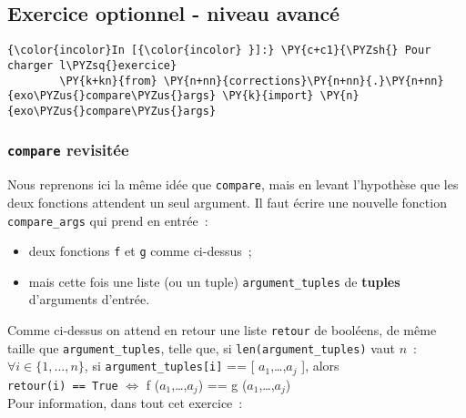     \hypertarget{exercice-optionnel---niveau-avancuxe9}{%
\subsection{Exercice optionnel - niveau
avancé}\label{exercice-optionnel---niveau-avancuxe9}}

    \begin{Verbatim}[commandchars=\\\{\}]
{\color{incolor}In [{\color{incolor} }]:} \PY{c+c1}{\PYZsh{} Pour charger l\PYZsq{}exercice}
        \PY{k+kn}{from} \PY{n+nn}{corrections}\PY{n+nn}{.}\PY{n+nn}{exo\PYZus{}compare\PYZus{}args} \PY{k}{import} \PY{n}{exo\PYZus{}compare\PYZus{}args}
\end{Verbatim}


    \hypertarget{compare-revisituxe9e}{%
\subsubsection{\texorpdfstring{\texttt{compare}
revisitée}{compare revisitée}}\label{compare-revisituxe9e}}

    Nous reprenons ici la même idée que \texttt{compare}, mais en levant
l'hypothèse que les deux fonctions attendent un seul argument. Il faut
écrire une nouvelle fonction \texttt{compare\_args} qui prend en
entrée~:

\begin{itemize}
	\item 
	deux fonctions \texttt{f} et \texttt{g} comme ci-dessus~;
	\item
	mais cette fois une liste (ou un tuple) \texttt{argument\_tuples} de
	\textbf{tuples} d'arguments d'entrée.
\end{itemize}

Comme ci-dessus on attend en retour une liste \texttt{retour} de
booléens, de même taille que \texttt{argument\_tuples}, telle que, si
\texttt{len(argument\_tuples)} vaut \(n\)~:\\

\(\forall i \in \{1,...,n\}\), si \texttt{argument\_tuples{[}i{]}} ==
{[} \(a_1\),\ldots{},\(a_j\) {]}, alors\\

\texttt{retour(i)\ ==\ True} \(\Longleftrightarrow\) f
(\(a_1\),\ldots{},\(a_j\)) == g (\(a_1\),\ldots{},\(a_j\))\\

    Pour information, dans tout cet exercice~:

